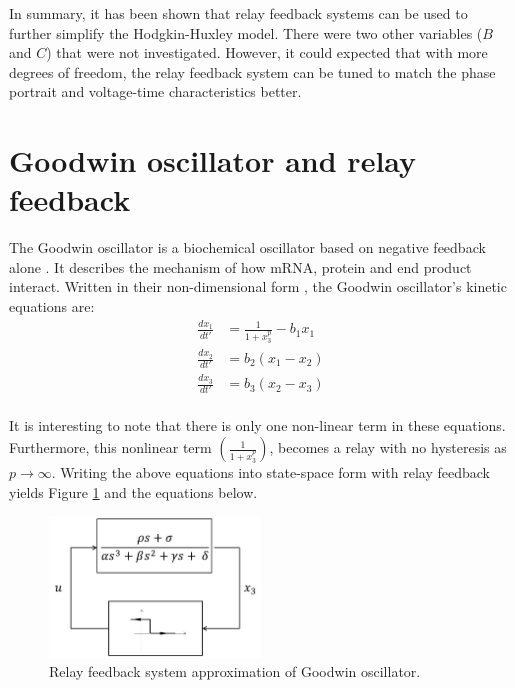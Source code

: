 \documentclass[a4paper]{article}
\begin{document}
In summary, it has been shown that relay feedback systems can be used to further simplify the Hodgkin-Huxley model. There were two other variables ($B$ and $C$) that were not investigated. However, it could expected that with more degrees of freedom, the relay feedback system can be tuned to match the phase portrait and voltage-time characteristics better.


\section{Goodwin oscillator and relay feedback}
The Goodwin oscillator is a biochemical oscillator based on negative feedback alone \cite{fall}. It describes the mechanism of how mRNA, protein and end product interact. Written in their non-dimensional form \cite{fall}, the Goodwin oscillator's kinetic equations are:
\begin{align}
\frac{dx_1}{dt'} &= \frac{1}{1 + x_3^p} - b_1x_1 \\
\frac{dx_2}{dt'} &= b_2(x_1 - x_2) \\
\frac{dx_3}{dt'} &= b_3(x_2 - x_3) \\
\end{align}

It is interesting to note that there is only one non-linear term in these equations. Furthermore, this nonlinear term $(\frac{1}{1 + x_3^p})$, becomes a relay with no hysteresis as $p \rightarrow \infty$. Writing the above equations into state-space form with relay feedback yields Figure \ref{goodwin_transfer} and the equations below.

\begin{figure}
\includegraphics[width = 0.5\textwidth]{goodwin_relay_transfer}
\caption{Relay feedback system approximation of Goodwin oscillator. }
\label{goodwin_transfer}
\end{figure}
\end{document}
